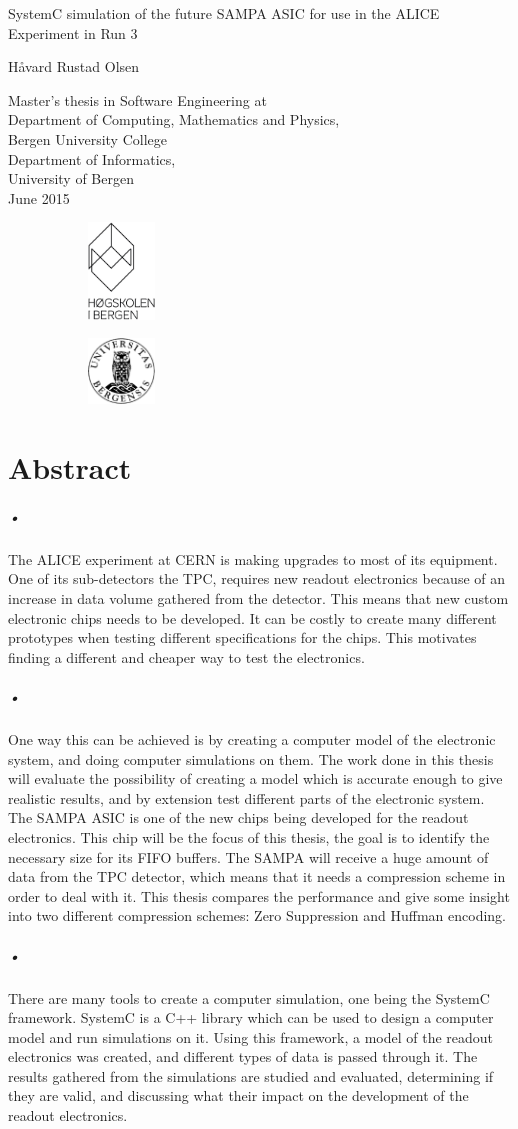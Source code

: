 \documentclass[a4paper, 12pt]{report}
\newcommand*{\titlePage}{\begingroup %
\fontfamily{phv}\selectfont
\centering %

\vspace{200pt}
{\Huge SystemC simulation of the future SAMPA ASIC for use in the ALICE Experiment in Run 3} \\ %
\vspace{5pt}

{\Large \textsl{}} %
\vspace{50pt}

{\Large{H\r{a}vard Rustad Olsen}}\\ %

\vfill %

{\Large Master's thesis in Software Engineering at \\
\vspace{10pt}
Department of Computing, Mathematics and Physics, \\
Bergen University College \\
\vspace{10pt}
Department of  Informatics, \\
University of Bergen \\}
\vspace{10pt}
{\large June 2015} %


\begin{figure}[h]
		\begin{subfigure}[]{50pt}
			\includegraphics[width=50pt]{HIB_sort_hovedlogo.eps}
		\end{subfigure}
		\hfill
		\begin{subfigure}[]{50pt}
			\includegraphics[width=50pt]{uib-logo.eps}
		\end{subfigure}

\end{figure}

\endgroup}
\begin{document}
\pagestyle{empty} %

\titlePage %

\newpage
\mbox{}
\thispagestyle{empty}
\newpage

\chapter*{Abstract}

\paragraph{•}
The ALICE experiment at CERN is making upgrades to most of its equipment.
One of its sub-detectors the TPC, requires new readout electronics because of an increase in data volume gathered from the detector.
This means that new custom electronic chips needs to be developed.
It can be costly to create many different prototypes when testing different specifications for the chips.
This motivates finding a different and cheaper way to test the electronics.

\paragraph{•}
One way this can be achieved is by creating a computer model of the electronic system, and doing computer simulations on them.
The work done in this thesis will evaluate the possibility of creating a model which is accurate enough to give realistic results, and by extension test different parts of the electronic system.
The SAMPA ASIC is one of the new chips being developed for the readout electronics.
This chip will be the focus of this thesis, the goal is to identify the necessary size for its FIFO buffers.
The SAMPA will receive a huge amount of data from the TPC detector, which means that it needs a compression scheme in order to deal with it.
This thesis compares the performance and give some insight into two different compression schemes: Zero Suppression and Huffman encoding.

\paragraph{•}
There are many tools to create a computer simulation, one being the SystemC framework.
SystemC is a C++ library which can be used to design a computer model and run simulations on it.
Using this framework, a model of the readout electronics was created, and different types of data is passed through it.
The results gathered from the simulations are studied and evaluated, determining if they are valid, and discussing what their impact on the development of the readout electronics.
\end{document}
